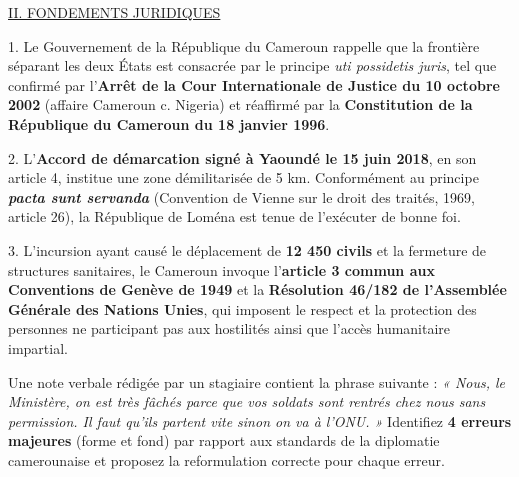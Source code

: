 \documentclass[11pt]{article}
\begin{document}
\begin{corrige}
\underline{II. FONDEMENTS JURIDIQUES}

1. Le Gouvernement de la République du Cameroun rappelle que la frontière séparant les deux États est consacrée par le principe \emph{uti possidetis juris}, tel que confirmé par l'\textbf{Arrêt de la Cour Internationale de Justice du 10 octobre 2002} (affaire Cameroun c. Nigeria) et réaffirmé par la \textbf{Constitution de la République du Cameroun du 18 janvier 1996}.

2. L'\textbf{Accord de démarcation signé à Yaoundé le 15 juin 2018}, en son article 4, institue une zone démilitarisée de 5 km. Conformément au principe \emph{\textbf{pacta sunt servanda}} (Convention de Vienne sur le droit des traités, 1969, article 26), la République de Loména est tenue de l'exécuter de bonne foi.

3. L'incursion ayant causé le déplacement de \textbf{12 450 civils} et la fermeture de structures sanitaires, le Cameroun invoque l'\textbf{article 3 commun aux Conventions de Genève de 1949} et la \textbf{Résolution 46/182 de l'Assemblée Générale des Nations Unies}, qui imposent le respect et la protection des personnes ne participant pas aux hostilités ainsi que l'accès humanitaire impartial.
\end{corrige}

\begin{exercice}
Une note verbale rédigée par un stagiaire contient la phrase suivante : \emph{« Nous, le Ministère, on est très fâchés parce que vos soldats sont rentrés chez nous sans permission. Il faut qu'ils partent vite sinon on va à l'ONU. »}
Identifiez \textbf{4 erreurs majeures} (forme et fond) par rapport aux standards de la diplomatie camerounaise et proposez la reformulation correcte pour chaque erreur.
\end{exercice}
\end{document}
